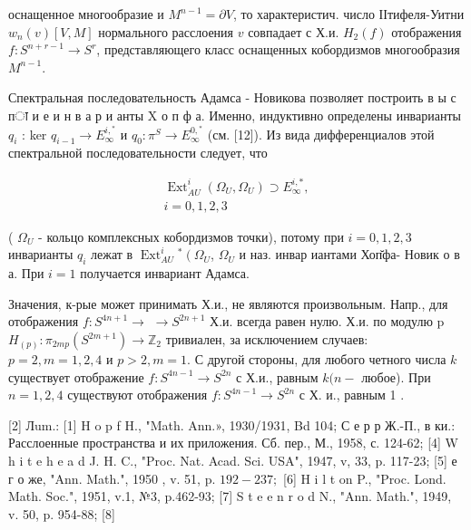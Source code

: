 \documentclass[10pt]{article}
\begin{document}
оснащенное многообразие и $M^{n-1}=\partial V$, то характеристич. число ІІтифеля-Уитни $w_{n}(v)[V, M]$ нормального расслоения $v$ совпадает с Х.и. $H_{2}(f)$ отображения $f: S^{n+r-1} \longrightarrow S^{r}$, представляющего класс оснащенных кобордизмов многообразия $M^{n-1}$.



Спектральная последовательность Адамса - Новикова позволяет построить в ы с пा и е и н в а р и анты $\mathrm{X}$ о п ф а. Именно, индуктивно определены инварианты $q_{i}$ : ker $q_{i-1} \longrightarrow E_{\infty}^{i,{ }^{*}}$ и $q_{0}: \pi^{S} \longrightarrow E_{\infty}^{0,{ }^{*}}$ (см. [12]). Из вида дифференциалов этой спектральной последовательности следует, что



\[

\begin{gathered}

\operatorname{Ext}_{\dot{A} U}^{i}\left(\Omega_{U}, \Omega_{U}\right) \supset E_{\infty}^{i, *}, \\

i=0,1,2,3

\end{gathered}

\]



( $\Omega_{U}$ - кольцо комплексных кобордизмов точки), потому при $i=0,1,2,3$ инварианты $q_{i}$ лежат в $\operatorname{Ext}_{A U}^{i}{ }^{*}\left(\Omega_{U}\right.$, $\Omega_{U}$ и наз. инвар иантами Хоп̆фа- Новик о в а. При $i=1$ получается инвариант Адамса.



Значения, к-рые может принимать Х.и., не являются произвольным. Напр., для отображения $f: S^{4 n+1} \longrightarrow$ $\longrightarrow S^{2 n+1}$ Х.и. всегда равен нулю. Х.и. по модулю p $H_{(p)}: \pi_{2 m p}\left(S^{2 m+1}\right) \longrightarrow \mathbb{Z}_{2}$ тривиален, за исключением случаев: $p=2, m=1,2,4$ и $p>2, m=1$. С другой стороны, для любого четного числа $k$ существует отображение $f: S^{4 n-1} \longrightarrow S^{2 n}$ с Х.и., равным $k(n-$ любое). При $n=1,2,4$ существуют отображения $f: S^{4 n-1} \longrightarrow S^{2 n}$ с Х. и., равным 1 .



[2] Лum.: [1] H o p f H., "Math. Ann.», 1930/1931, Bd 104; С е р р Ж.-П., в ки.: Расслоенные пространства и их приложения. Сб. пер., М., 1958, с. 124-62; [4] W h i t e h e a d J. H. C., "Proc. Nat. Acad. Sci. USA", 1947, v, 33, p. 117-23; [5] е г о же, "Ann. Math.", 1950 , v. 51, p. $192-237 ;$ [6] H i l t on P., "Proc. Lond. Math. Soc.", 1951, v.1, №3, p.462-93; [7] S t e e n r o d N., "Ann. Math.", 1949, v. 50, p. 954-88; [8]
\end{document}
